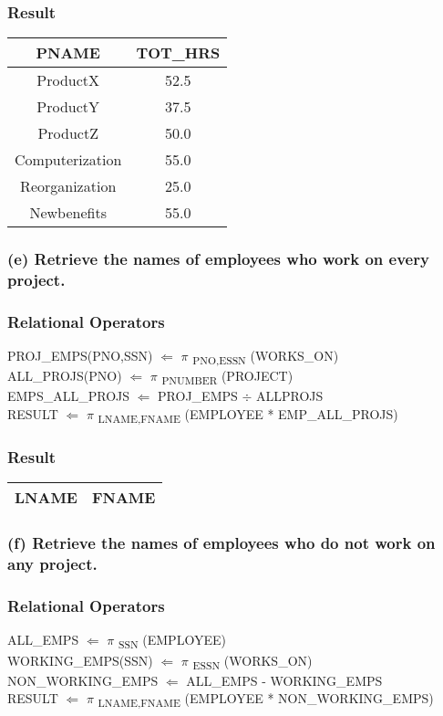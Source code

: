 \subsubsection*{Result}  
\begin{center}
\begin{tabular}{ c | c }
  PNAME & TOT\_HRS  \\ \hline
  ProductX & 52.5 \\
  ProductY & 37.5 \\
  ProductZ & 50.0 \\
  Computerization & 55.0 \\
  Reorganization & 25.0 \\
  Newbenefits & 55.0 \\
\end{tabular}
\end{center}

\subsubsection*{(e) Retrieve the names of employees who work on every project.}
\subsubsection*{Relational Operators}
PROJ\_EMPS(PNO,SSN) $\Leftarrow$ $\pi$ \textsubscript{PNO,ESSN} (WORKS\_ON) \\
ALL\_PROJS(PNO) $\Leftarrow$ $\pi$ \textsubscript{PNUMBER} (PROJECT) \\
EMPS\_ALL\_PROJS $\Leftarrow$ PROJ\_EMPS $\div$ ALLPROJS \\
RESULT $\Leftarrow$ $\pi$ \textsubscript{LNAME,FNAME} (EMPLOYEE * EMP\_ALL\_PROJS)

\subsubsection*{Result}
\begin{center}
\begin{tabular}{ c | c }
  LNAME & FNAME \\ \hline
\end{tabular}
\end{center}

\subsubsection*{(f) Retrieve the names of employees who do not work on any project.}
\subsubsection*{Relational Operators}
ALL\_EMPS $\Leftarrow$ $\pi$ \textsubscript{SSN} (EMPLOYEE) \\
WORKING\_EMPS(SSN) $\Leftarrow$ $\pi$ \textsubscript{ESSN} (WORKS\_ON)\\
NON\_WORKING\_EMPS $\Leftarrow$ ALL\_EMPS - WORKING\_EMPS\\
RESULT $\Leftarrow$ $\pi$ \textsubscript{LNAME,FNAME} (EMPLOYEE * NON\_WORKING\_EMPS)


